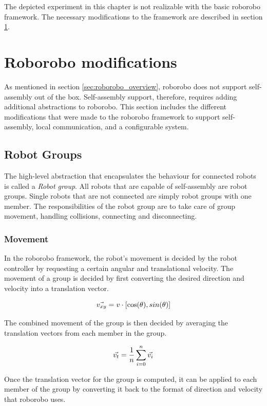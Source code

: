 The depicted experiment in this chapter is not realizable with the basic roborobo framework.
The necessary modifications to the framework are described in section \ref{sec:modifications}.

\section{Roborobo modifications}
\label{sec:modifications}
As mentioned in section \ref{sec:roborobo_overview}, roborobo does not support self-assembly out of the box.
Self-assembly support, therefore, requires adding additional abstractions to roborobo.
This section includes the different modifications that were made to the roborobo framework to support self-assembly, local communication, and a configurable system.

\subsection{Robot Groups}
The high-level abstraction that encapsulates the behaviour for connected robots is called a \emph{Robot group}.
All robots that are capable of self-assembly are robot groups.
Single robots that are not connected are simply robot groups with one member.
The responsibilities of the robot group are to take care of group movement, handling collisions, connecting and disconnecting. 
	
\subsubsection{Movement}
In the roborobo framework, the robot's movement is decided by the robot controller by requesting a certain angular and translational velocity.
The movement of a group is decided by first converting the desired direction and velocity into a translation vector.

\begin{equation}
\centering
\vec{v_{xy}} = v\cdot[\cos(\theta), sin(\theta)]
\end{equation}

The combined movement of the group is then decided by averaging the translation vectors from each member in the group.

\begin{equation}
\centering
\vec{v_t} = \frac{1}{n}\sum_{i=0}^{n} \vec{v_{i}}
\end{equation}

Once the translation vector for the group is computed, it can be applied to each member of the group by converting it back to the format of direction and velocity that roborobo uses.

